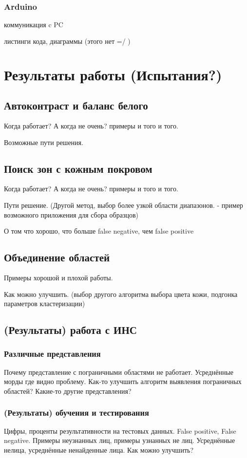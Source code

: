 \documentclass[12pt]{report}
\begin{document}
\subsection{Arduino}
коммуникация c PC

листинги кода, диаграммы (этого нет =/ )


\chapter{Результаты работы (Испытания?)}
\thispagestyle{fancy}

\section{Автоконтраст и баланс белого}
Когда работает? А когда не очень? примеры и того и того.

Возможные пути решения.
\section{Поиск зон с кожным покровом}
Когда работает? А когда не очень? примеры и того и того.

Пути решение. (Другой метод, выбор более узкой области диапазонов. - пример возможного приложения для сбора образцов)

О том что хорошо, что больше false negative, чем false positive
\section{Объединение областей}
Примеры хорошой и плохой работы.

Как можно улучшить. (выбор другого алгоритма выбора цвета кожи, подгонка параметров кластеризации)
\section{(Результаты) работа с ИНС}
\subsection{Различные представления}
Почему представление с пограничными областями не работает. Усреднённые морды где видно проблему. Как-то улучшить алгоритм выявления пограничных областей? Какие-то другие представления?
\subsection{(Результаты) обучения и тестирования}
Цифры, проценты результативности на тестовых данных. False positive, False negative. Примеры неузнанных лиц, примеры узнанных не лиц. Усреднённые нелица, усреднённые ненайденные лица.
Как можно улучшить?
\end{document}
